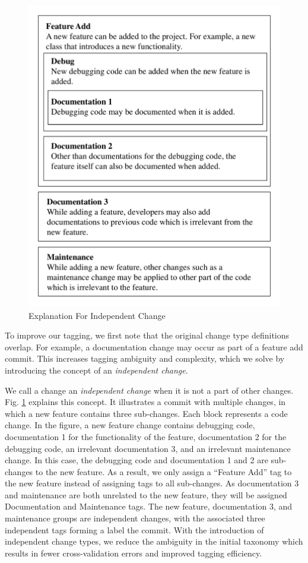 \begin{figure}[htbp]
\centerline{\includegraphics[scale=0.5]{figures/independent_change.pdf}}
\caption{Explanation For Independent Change}
\label{fig:Relationship}
\end{figure}

To improve our tagging, we first note that the original change type definitions overlap. For example, a documentation change may occur as part of a feature add commit. This increases tagging ambiguity and complexity, which we solve by introducing the concept of an \textit{independent change}.

We call a change an \textit{independent change} when it is not a part of other changes.
Fig. \ref{fig:Relationship} explains this concept. It illustrates a commit with multiple changes, in which a new feature contains three sub-changes.
Each block represents a code change. 
In the figure, a new feature change contains debugging code, documentation 1 for the functionality of the feature, documentation 2 for the debugging code, an irrelevant documentation 3, and an irrelevant maintenance change. 
In this case, the debugging code and documentation 1 and 2 are sub-changes to the new feature. 
As a result, we only assign a ``Feature Add'' tag to the new feature instead of assigning tags to all sub-changes. 
As documentation 3 and maintenance are both unrelated to the new feature, they will be assigned Documentation and Maintenance tags.
The new feature, documentation 3, and maintenance groups are independent changes, with the associated three independent tags forming a label the commit. 
With the introduction of independent change types, we reduce the ambiguity in the initial taxonomy which results in fewer cross-validation errors and improved tagging efficiency.

